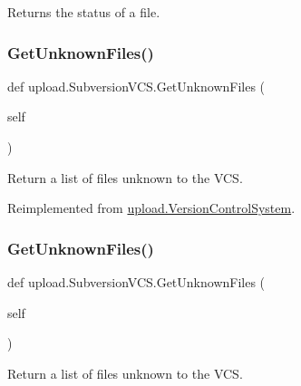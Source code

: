 \begin{DoxyVerb}Returns the status of a file.\end{DoxyVerb}
 \mbox{\label{classupload_1_1_subversion_v_c_s_a494ba1010992d83cac015bc396ab693a}} 
\subsubsection{\texorpdfstring{GetUnknownFiles()}{GetUnknownFiles()}\hspace{0.1cm}{\footnotesize\ttfamily [1/2]}}
{\footnotesize\ttfamily def upload.\+Subversion\+V\+C\+S.\+Get\+Unknown\+Files (\begin{DoxyParamCaption}\item[{}]{self }\end{DoxyParamCaption})}

\begin{DoxyVerb}Return a list of files unknown to the VCS.\end{DoxyVerb}
 

Reimplemented from \mbox{\hyperlink{classupload_1_1_version_control_system_a56a60e56aa9aff3df4001d2f84cab884}{upload.\+Version\+Control\+System}}.

\mbox{\label{classupload_1_1_subversion_v_c_s_a494ba1010992d83cac015bc396ab693a}} 
\subsubsection{\texorpdfstring{GetUnknownFiles()}{GetUnknownFiles()}\hspace{0.1cm}{\footnotesize\ttfamily [2/2]}}
{\footnotesize\ttfamily def upload.\+Subversion\+V\+C\+S.\+Get\+Unknown\+Files (\begin{DoxyParamCaption}\item[{}]{self }\end{DoxyParamCaption})}

\begin{DoxyVerb}Return a list of files unknown to the VCS.\end{DoxyVerb}
 

